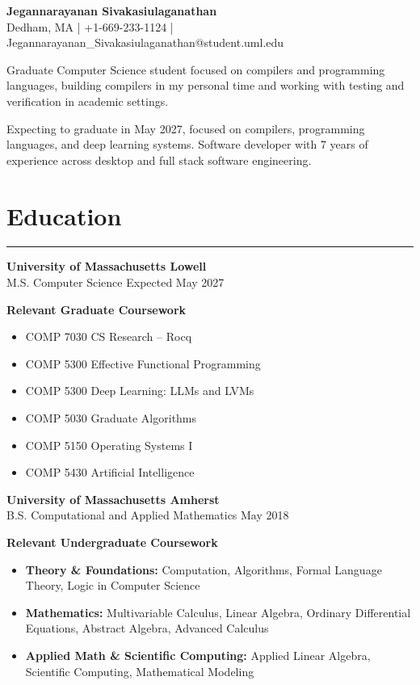 \documentclass[11pt]{article}
\newcommand{\sectionline}{\noindent\rule{\linewidth}{0.5pt}}
\begin{document}
\begin{center}
    {\LARGE \textbf{Jegannarayanan Sivakasiulaganathan}} \\
    Dedham, MA \quad | \quad +1-669-233-1124 \quad | \quad Jegannarayanan\_Sivakasiulaganathan@student.uml.edu
\end{center}

Graduate Computer Science student focused on compilers and programming 
languages, building compilers in my personal time and working with testing and 
verification in academic settings.

Expecting to graduate in May 2027, focused on compilers, programming languages, 
and deep learning systems. Software developer with 7 years of experience 
across desktop and full stack software engineering. 

\section*{Education}
\sectionline

\textbf{University of Massachusetts Lowell} \\
M.S. Computer Science \hfill Expected May 2027

\textbf{Relevant Graduate Coursework}
\begin{itemize}[leftmargin=*]
    \item COMP 7030 CS Research -- Rocq 
    \item COMP 5300 Effective Functional Programming 
    \item COMP 5300 Deep Learning: LLMs and LVMs 
    \item COMP 5030 Graduate Algorithms
    \item COMP 5150 Operating Systems I
    \item COMP 5430 Artificial Intelligence
\end{itemize}

\textbf{University of Massachusetts Amherst} \\
B.S. Computational and Applied Mathematics \hfill May 2018

\textbf{Relevant Undergraduate Coursework}
\begin{itemize}[leftmargin=*]
    \item \textbf{Theory \& Foundations:} Computation, Algorithms, Formal Language Theory, Logic in Computer Science
    \item \textbf{Mathematics:} Multivariable Calculus, Linear Algebra, Ordinary Differential Equations, Abstract Algebra, Advanced Calculus
    \item \textbf{Applied Math \& Scientific Computing:} Applied Linear Algebra, Scientific Computing, Mathematical Modeling
\end{itemize}
\end{document}
